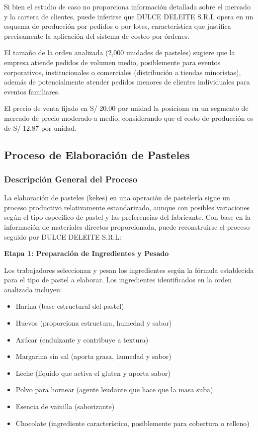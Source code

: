 \documentclass[
  stu,
  floatsintext,
  longtable,
  a4paper,
  nolmodern,
  notxfonts,
  notimes,
  12pt,
  colorlinks=true,linkcolor=blue,citecolor=blue,urlcolor=blue]{apa7}
\providecommand{\tightlist}{%
  \setlength{\itemsep}{0pt}\setlength{\parskip}{0pt}}
\begin{document}
Si bien el estudio de caso no proporciona información detallada sobre el
mercado y la cartera de clientes, puede inferirse que DULCE DELEITE
S.R.L opera en un esquema de producción por pedidos o por lotes,
característica que justifica precisamente la aplicación del sistema de
costeo por órdenes.

El tamaño de la orden analizada (2,000 unidades de pasteles) sugiere que
la empresa atiende pedidos de volumen medio, posiblemente para eventos
corporativos, institucionales o comerciales (distribución a tiendas
minoristas), además de potencialmente atender pedidos menores de
clientes individuales para eventos familiares.

El precio de venta fijado en S/ 20.00 por unidad la posiciona en un
segmento de mercado de precio moderado a medio, considerando que el
costo de producción es de S/ 12.87 por unidad.

\subsection{Proceso de Elaboración de
Pasteles}\label{proceso-de-elaboraciuxf3n-de-pasteles}

\subsubsection{Descripción General del
Proceso}\label{descripciuxf3n-general-del-proceso}

La elaboración de pasteles (kekes) en una operación de pastelería sigue
un proceso productivo relativamente estandarizado, aunque con posibles
variaciones según el tipo específico de pastel y las preferencias del
fabricante. Con base en la información de materiales directos
proporcionada, puede reconstruirse el proceso seguido por DULCE DELEITE
S.R.L:

\textbf{Etapa 1: Preparación de Ingredientes y Pesado}

Los trabajadores seleccionan y pesan los ingredientes según la fórmula
establecida para el tipo de pastel a elaborar. Los ingredientes
identificados en la orden analizada incluyen:

\begin{itemize}
\tightlist
\item
  Harina (base estructural del pastel)
\item
  Huevos (proporciona estructura, humedad y sabor)
\item
  Azúcar (endulzante y contribuye a textura)
\item
  Margarina sin sal (aporta grasa, humedad y sabor)
\item
  Leche (líquido que activa el gluten y aporta sabor)
\item
  Polvo para hornear (agente leudante que hace que la masa suba)
\item
  Esencia de vainilla (saborizante)
\item
  Chocolate (ingrediente característico, posiblemente para cobertura o
  relleno)
\end{itemize}
\end{document}
